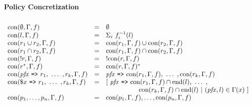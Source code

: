 \documentclass[twocolumn, openany]{sig-alternate-10pt}
\newcommand{\Path}{\texttt{=>}}
\newcommand{\hdr}[2]{\flushleft \chdr{\hspace{5mm}#1}{#2}}
\newcommand{\chdr}[2]{\textbf{#1} {#2} \\ \centering}%
\begin{document}
\begin{figure*}[t!]
  \vspace*{-2\baselineskip}
  \begin{minipage}[t]{1.01\linewidth}
  \hdr{Policy Concretization}{}
  \vspace*{-2\baselineskip}
  \[ \begin{array}{lcl}
     \\
     \Con(\emptyset, \Gamma, f)      &=& \emptyset \\
     \Con(l, \Gamma, f)              &=& \Sigma_i ~ f_i^{-1}(l) \\
     \Con(r_1 \cup r_2, \Gamma, f)   &=& \Con(r_1,\Gamma,f) \cup \Con(r_2,\Gamma,f) \\
     \Con(r_1 \cap r_2, \Gamma, f)   &=& \Con(r_1,\Gamma,f) \cap \Con(r_2,\Gamma,f) \\
     \Con(!r, \Gamma, f)             &=& !\Con(r,\Gamma,f) \\
     \Con(r^*, \Gamma, f)            &=& \Con(r,\Gamma,f)^* \\%
     \Con(\Pfx ~\Path~ r_1, ~\dots~, r_k, \Gamma, f) &=&
          \Pfx ~\Path~ \Con(r_1,\Gamma,f), ~\dots~, \Con(r_k,\Gamma,f)  \\%
     \Con(\$x ~\Path~ r_1, ~\dots~, r_k, \Gamma, f) &=&%
         [~ \Pfx ~\Path~ \Con(r_1,\Gamma,f) \cap \text{end}(l), ~\dots~, \\%
         & & ~~~~~~~~~~~~~~~ \Con(r_k,\Gamma,f) \cap \text{end}(l) ~\vert~ (\Pfx,l) \in \Gamma(x) ~]  \\%
     \Con(p_1, \dots, p_n, \Gamma,f) &=& \Con(p_1, \Gamma,f), \dots, \Con(p_n, \Gamma,f) \\%

  \end{array} \]%
  \end{minipage}%

  \vspace{1em}
  \vspace{1em}%


\end{figure*}
\end{document}
